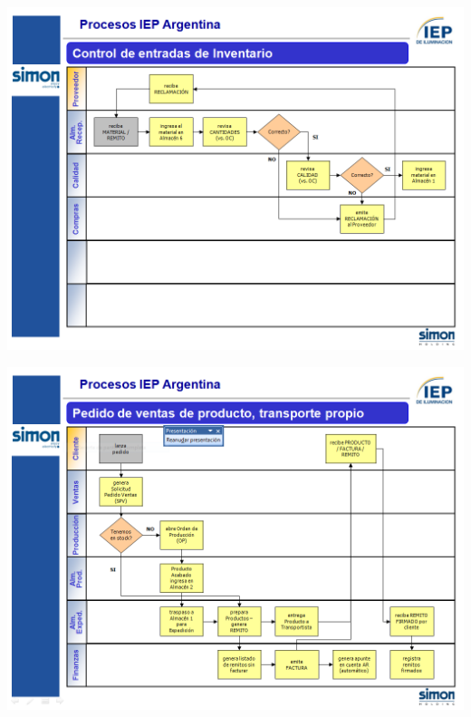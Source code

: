 \begin{center}
 \includegraphics[angle=90,scale=0.80,keepaspectratio=true]{./Images/Procesos-Circuitos-Originales-IEP/Circuito-Compras2-IEP.PNG}
\end{center}

\begin{center}
 \includegraphics[angle=90,scale=0.80,keepaspectratio=true]{./Images/Procesos-Circuitos-Originales-IEP/Circuito-Ventas-IEP.PNG}
\end{center}

